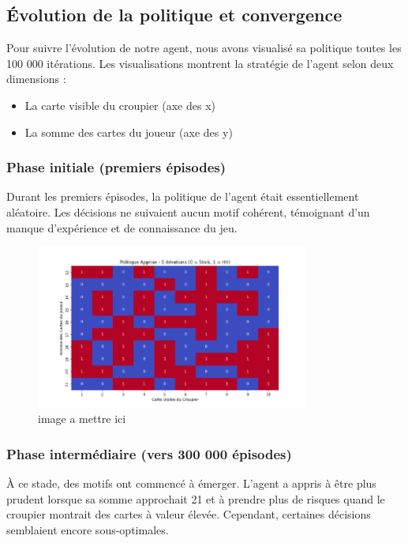 \documentclass{article}
\begin{document}
\subsection{Évolution de la politique et convergence}

\quad Pour suivre l'évolution de notre agent, nous avons visualisé sa politique toutes les 100 000 itérations. Les visualisations montrent la stratégie de l'agent selon deux dimensions : 
\begin{itemize} 
    \item  La carte visible du croupier (axe des x)
    \item La somme des cartes du joueur (axe des y)
\end{itemize}

    \subsubsection{Phase initiale (premiers épisodes)}
    
    \quad Durant les premiers épisodes, la politique de l'agent était essentiellement aléatoire. Les décisions ne suivaient aucun motif cohérent, témoignant d'un manque d'expérience et de connaissance du jeu.\\
    
    \begin{figure}[ht]
        \centering
        \includegraphics[width=0.8\textwidth]{1.png}
        \caption{image a mettre ici}
    \end{figure}

    \subsubsection{Phase intermédiaire (vers 300 000 épisodes)}
    
    \quad À ce stade, des motifs ont commencé à émerger. L'agent a appris à être plus prudent lorsque sa somme approchait 21 et à prendre plus de risques quand le croupier montrait des cartes à valeur élevée. Cependant, certaines décisions semblaient encore sous-optimales.\\
\end{document}

